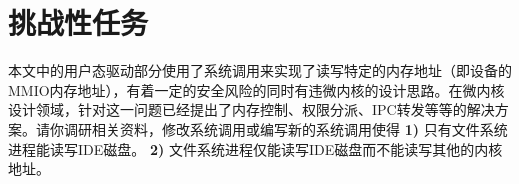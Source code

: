 \section{挑战性任务}

本文中的用户态驱动部分使用了系统调用来实现了读写特定的内存地址（即设备的MMIO内存地址），有着一定的安全风险的同时有违微内核的设计思路。在微内核设计领域，针对这一问题已经提出了内存控制、权限分派、IPC转发等等的解决方案。请你调研相关资料，修改系统调用或编写新的系统调用使得 \textbf{1)} 只有文件系统进程能读写IDE磁盘。 \textbf{2)} 文件系统进程仅能读写IDE磁盘而不能读写其他的内核地址。




